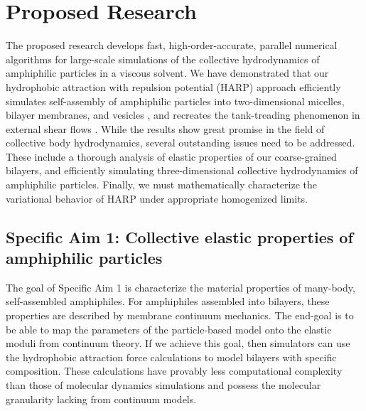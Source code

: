 \section{Proposed Research}
\label{sec:proposed-work}
The proposed research develops fast,
high-order-accurate, parallel numerical algorithms for large-scale
simulations of the collective hydrodynamics of amphiphilic particles in a viscous solvent.
%
We have demonstrated that our hydrophobic attraction with repulsion potential (HARP) approach efficiently simulates
self-assembly of amphiphilic particles into two-dimensional micelles, bilayer membranes, and vesicles \cite{Fu2018_SIAM}, and
recreates the tank-treading phenomenon in external shear flows
\cite{Fu20} .
%
While the results show great promise in the field of collective body hydrodynamics,
several outstanding issues need to be addressed. These include a thorough 
analysis of elastic properties of our coarse-grained bilayers, and 
efficiently simulating three-dimensional collective hydrodynamics of amphiphilic particles.
Finally, we must mathematically characterize the variational behavior of HARP under appropriate homogenized limits.

\subsection{Specific Aim 1: Collective elastic properties of amphiphilic particles}
\label{subsec:specific_aim_1}

The goal of Specific Aim 1 is characterize the material properties of many-body, self-assembled amphiphiles.
For amphiphiles assembled into bilayers, these properties are described by membrane continuum mechanics.
The end-goal is to be able to map the parameters of the particle-based model onto the elastic moduli from continuum theory.
If we achieve this goal, then simulators can use the hydrophobic attraction force calculations
to model bilayers with specific composition. These calculations have provably less computational complexity than
those of molecular dynamics simulations and possess the molecular granularity lacking from continuum models.

